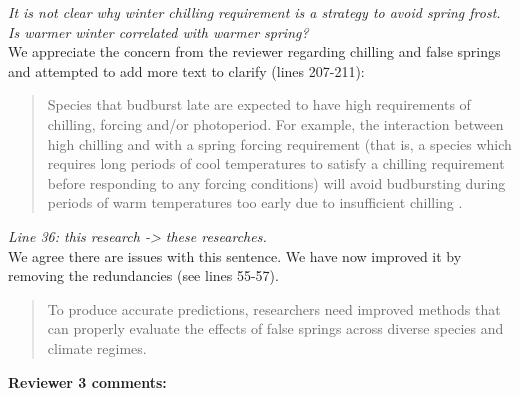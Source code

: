 \documentclass[11pt,a4paper]{article}
\begin{document}
\textit{It is not clear why winter chilling requirement is a strategy to avoid spring frost. Is warmer winter correlated with warmer spring?} \\

We appreciate the concern from the reviewer regarding chilling and false springs and attempted to add more text to clarify (lines 207-211): \\

\begin{quotation}
Species that budburst late are expected to have high requirements of chilling, forcing and/or photoperiod. For example, the interaction between high chilling and with a spring forcing requirement (that is, a species which requires long periods of cool temperatures to satisfy a chilling requirement before responding to any forcing conditions) will avoid budbursting during periods of warm temperatures too early due to insufficient chilling \citep{Basler2012}.
\end{quotation} 

\textit{Line 36: this research -> these researches.}\\

We agree there are issues with this sentence. We have now improved it by removing the redundancies (see lines 55-57). \\ %

\begin{quotation}
To produce accurate predictions, researchers need improved methods that can properly evaluate the effects of false springs across diverse species and climate regimes. 
\end{quotation} 

\textbf{ Reviewer 3 comments:} \\
\end{document}
